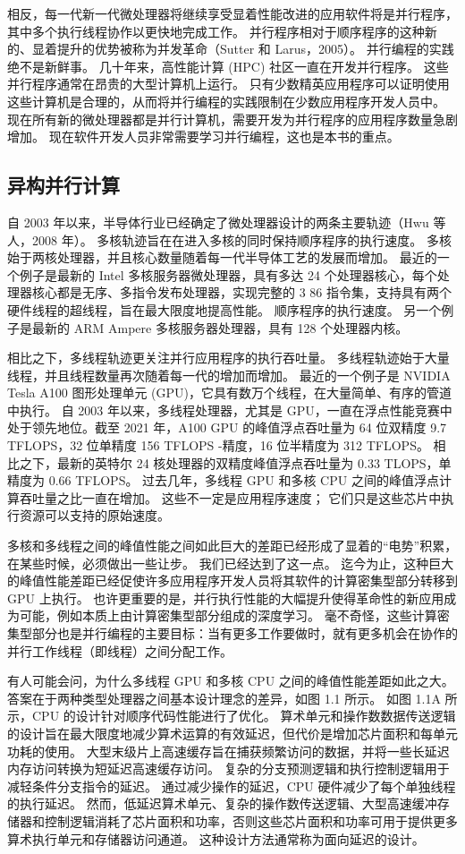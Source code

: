 相反，每一代新一代微处理器将继续享受显着性能改进的应用软件将是并行程序，其中多个执行线程协作以更快地完成工作。 并行程序相对于顺序程序的这种新的、显着提升的优势被称为并发革命（Sutter 和 Larus，2005）。 并行编程的实践绝不是新鲜事。 几十年来，高性能计算 (HPC) 社区一直在开发并行程序。 这些并行程序通常在昂贵的大型计算机上运行。 只有少数精英应用程序可以证明使用这些计算机是合理的，从而将并行编程的实践限制在少数应用程序开发人员中。 现在所有新的微处理器都是并行计算机，需要开发为并行程序的应用程序数量急剧增加。 现在软件开发人员非常需要学习并行编程，这也是本书的重点。

\subsection{异构并行计算}
自 2003 年以来，半导体行业已经确定了微处理器设计的两条主要轨迹（Hwu 等人，2008 年）。 多核轨迹旨在在进入多核的同时保持顺序程序的执行速度。 多核始于两核处理器，并且核心数量随着每一代半导体工艺的发展而增加。 最近的一个例子是最新的 Intel 多核服务器微处理器，具有多达 24 个处理器核心，每个处理器核心都是无序、多指令发布处理器，实现完整的 3 86 指令集，支持具有两个硬件线程的超线程，旨在最大限度地提高性能。 顺序程序的执行速度。 另一个例子是最新的 ARM Ampere 多核服务器处理器，具有 128 个处理器内核。

相比之下，多线程轨迹更关注并行应用程序的执行吞吐量。 多线程轨迹始于大量线程，并且线程数量再次随着每一代的增加而增加。 最近的一个例子是 NVIDIA Tesla A100 图形处理单元 (GPU)，它具有数万个线程，在大量简单、有序的管道中执行。 自 2003 年以来，多线程处理器，尤其是 GPU，一直在浮点性能竞赛中处于领先地位。截至 2021 年，A100 GPU 的峰值浮点吞吐量为 64 位双精度 9.7 TFLOPS，32 位单精度 156 TFLOPS -精度，16 位半精度为 312 TFLOPS。 相比之下，最新的英特尔 24 核处理器的双精度峰值浮点吞吐量为 0.33 TLOPS，单精度为 0.66 TFLOPS。 过去几年，多线程 GPU 和多核 CPU 之间的峰值浮点计算吞吐量之比一直在增加。 这些不一定是应用程序速度； 它们只是这些芯片中执行资源可以支持的原始速度。

多核和多线程之间的峰值性能之间如此巨大的差距已经形成了显着的“电势”积累，在某些时候，必须做出一些让步。 我们已经达到了这一点。 迄今为止，这种巨大的峰值性能差距已经促使许多应用程序开发人员将其软件的计算密集型部分转移到 GPU 上执行。 也许更重要的是，并行执行性能的大幅提升使得革命性的新应用成为可能，例如本质上由计算密集型部分组成的深度学习。 毫不奇怪，这些计算密集型部分也是并行编程的主要目标：当有更多工作要做时，就有更多机会在协作的并行工作线程（即线程）之间分配工作。

有人可能会问，为什么多线程 GPU 和多核 CPU 之间的峰值性能差距如此之大。 答案在于两种类型处理器之间基本设计理念的差异，如图 1.1 所示。 如图 1.1A 所示，CPU 的设计针对顺序代码性能进行了优化。 算术单元和操作数数据传送逻辑的设计旨在最大限度地减少算术运算的有效延迟，但代价是增加芯片面积和每单元功耗的使用。 大型末级片上高速缓存旨在捕获频繁访问的数据，并将一些长延迟内存访问转换为短延迟高速缓存访问。 复杂的分支预测逻辑和执行控制逻辑用于减轻条件分支指令的延迟。 通过减少操作的延迟，CPU 硬件减少了每个单独线程的执行延迟。 然而，低延迟算术单元、复杂的操作数传送逻辑、大型高速缓冲存储器和控制逻辑消耗了芯片面积和功率，否则这些芯片面积和功率可用于提供更多算术执行单元和存储器访问通道。 这种设计方法通常称为面向延迟的设计。

